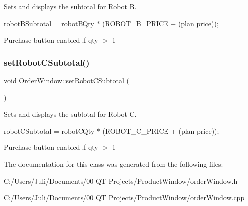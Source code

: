 Sets and displays the subtotal for Robot B. 

robot\+B\+Subtotal = robot\+B\+Qty $\ast$ (R\+O\+B\+O\+T\+\_\+\+B\+\_\+\+P\+R\+I\+CE + (plan price));

Purchase button enabled if qty $>$ 1 \mbox{\label{class_order_window_a5283f60b1a3076038b08160b37542fdc}} 
\subsubsection{\texorpdfstring{setRobotCSubtotal()}{setRobotCSubtotal()}}
{\footnotesize\ttfamily void Order\+Window\+::set\+Robot\+C\+Subtotal (\begin{DoxyParamCaption}{ }\end{DoxyParamCaption})}



Sets and displays the subtotal for Robot C. 

robot\+C\+Subtotal = robot\+C\+Qty $\ast$ (R\+O\+B\+O\+T\+\_\+\+C\+\_\+\+P\+R\+I\+CE + (plan price));

Purchase button enabled if qty $>$ 1 

The documentation for this class was generated from the following files\+:\begin{DoxyCompactItemize}
\item 
C\+:/\+Users/\+Juli/\+Documents/00 Q\+T Projects/\+Product\+Window/order\+Window.\+h\item 
C\+:/\+Users/\+Juli/\+Documents/00 Q\+T Projects/\+Product\+Window/order\+Window.\+cpp\end{DoxyCompactItemize}
